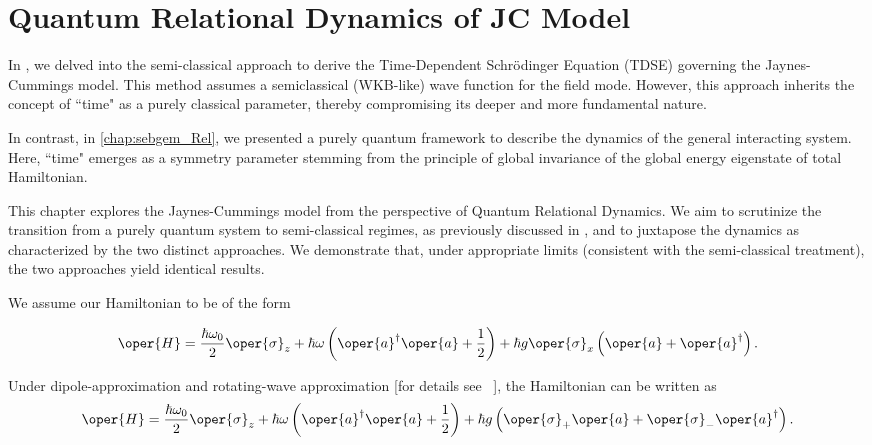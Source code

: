 \chapter{Quantum Relational Dynamics of JC Model
\label{chap5:RDQ_JCM_chap}}

In , we delved into the semi-classical approach to derive the Time-Dependent Schrödinger Equation (TDSE) governing the Jaynes-Cummings model. 
This method assumes a semiclassical (WKB-like) wave function for the field mode. However, 
this approach inherits the concept of ``time" as a purely classical parameter, thereby compromising its deeper and more fundamental nature.

In contrast, in \ref{chap:sebgem_Rel}, we presented a purely quantum framework to describe the dynamics of the general interacting system. Here, ``time" 
emerges as a symmetry parameter stemming from the principle of global invariance of the global energy 
eigenstate of total Hamiltonian.

This chapter explores the Jaynes-Cummings model from the perspective of Quantum Relational Dynamics. 
We aim to scrutinize the transition from a purely quantum system to semi-classical regimes, 
as previously discussed in , and to juxtapose the dynamics as 
characterized by the two distinct approaches. We demonstrate that, under appropriate limits
(consistent with the semi-classical treatment), the two approaches yield identical results. 

We assume our Hamiltonian to be of the form

\begin{eqnarray}
        \label{eq:chap5_JCM_Hamiltonian}
        \oper{H} = \frac{\hbar \omega_0}{2} \oper{\sigma}_z + \hbar \omega \left(\oper{a}^\dagger \oper{a} + \frac{1}{2}\right) 
        + \hbar g \oper{\sigma}_x\left(\oper{a} + \oper{a}^\dagger\right). 
\end{eqnarray}


Under dipole-approximation and rotating-wave approximation 
[for details see~ ], the Hamiltonian can be written as
\begin{equation}
        \label{eq:chap5_JCM_Hamiltonian_RWA}
        \oper{H} = \frac{\hbar \omega_0}{2} \oper{\sigma}_z + \hbar \omega \left(\oper{a}^\dagger \oper{a} + \frac{1}{2}\right) 
        + \hbar g \left(\oper{\sigma}_+ \oper{a} + \oper{\sigma}_- \oper{a}^\dagger\right).
\end{equation}

